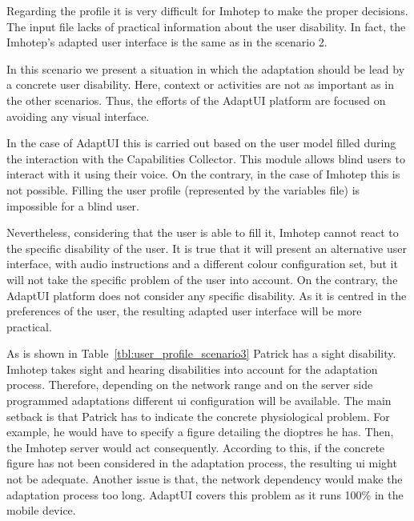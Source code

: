 
\inputminted[linenos=true, fontsize=\footnotesize, frame=lines]{json}{5_experiments_and_results/scenario3_imhotep.json}

Regarding the profile it is very difficult for Imhotep to make the 
proper decisions. The input file lacks of practical information about the user
disability. In fact, the Imhotep's adapted user interface is the same as in the
scenario 2.


\label{sec:scenario3_discussion}

In this scenario we present a situation in which the adaptation should be lead
by a concrete user disability. Here, context or activities are not as
important as in the other scenarios. Thus, the efforts of the AdaptUI platform
are focused on avoiding any visual interface. 

In the case of AdaptUI this is carried out based on the user model filled 
during the interaction with the Capabilities Collector. This module allows 
blind users to interact with it using their voice. On the contrary, in the case 
of Imhotep this is not possible. Filling the user profile (represented by the 
variables file) is impossible for a blind user.

Nevertheless, considering that the user is able to fill it, Imhotep cannot 
react to the specific disability of the user. It is true that it will present 
an alternative user interface, with audio instructions and a different colour 
configuration set, but it will not take the specific problem of the user into 
account. On the contrary, the AdaptUI platform does not consider any specific
disability. As it is centred in the preferences of the user, the resulting 
adapted user interface will be more practical.

\label{sec:scenario3_conclusions}

As is shown in Table~\ref{tbl:user_profile_scenario3} Patrick has a sight
disability. Imhotep takes sight and hearing disabilities into account for the
adaptation process. Therefore, depending on the network range and on the server
side programmed adaptations different \ac{ui} configuration will be available. 
The main setback is that Patrick has to indicate the concrete physiological 
problem. For example, he would have to specify a figure detailing the dioptres 
he has. Then, the Imhotep server would act consequently. According to this, if 
the concrete figure has not been considered in the adaptation process, the 
resulting \ac{ui} might not be adequate. Another issue is that, the network 
dependency would make the adaptation process too long. AdaptUI covers this problem 
as it runs 100\% in the mobile device.

